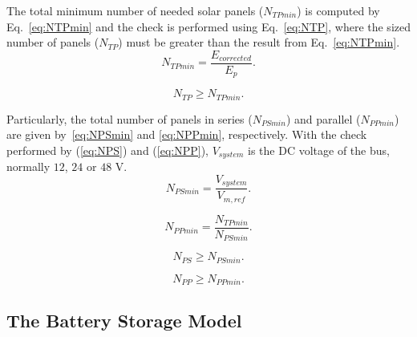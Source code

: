 \documentclass[journal]{IEEEtran}
\begin{document}
The total minimum number of needed solar panels ($N_{TPmin}$) is computed by Eq.~\eqref{eq:NTPmin} and the check is performed using Eq.~\eqref{eq:NTP}, where the sized number of panels ($ N_{TP} $) must be greater than the result from Eq.~\eqref{eq:NTPmin}.
\begin{equation}
\label{eq:NTPmin}
N_{TPmin} = \dfrac{E_{corrected}}{E_{p}}.
\end{equation}

\begin{equation}
\label{eq:NTP}
N_{TP} \geq N_{TPmin}.
\end{equation}

Particularly, the total number of panels in series ($N_{PSmin}$) and parallel ($N_{PPmin}$) are given by~\eqref{eq:NPSmin} and \eqref{eq:NPPmin}, respectively. With the check performed by (\ref{eq:NPS}) and (\ref{eq:NPP}), $ V_{system} $ is the DC voltage of the bus, normally $12$, $24$ or $48$ V.
\begin{equation}
\label{eq:NPSmin}
N_{PSmin} = \dfrac{V_{system}}{V_{m,ref}}.
\end{equation}

\begin{equation}
\label{eq:NPPmin}
N_{PPmin} = \dfrac{N_{TPmin}}{N_{PSmin}}.
\end{equation}

\begin{equation}
\label{eq:NPS}
N_{PS} \geq N_{PSmin}.
\end{equation}

\begin{equation}
\label{eq:NPP}
N_{PP} \geq N_{PPmin}.
\end{equation}

\subsection{The Battery Storage Model }
\label{sec:BATmodel}

  
\end{document}
